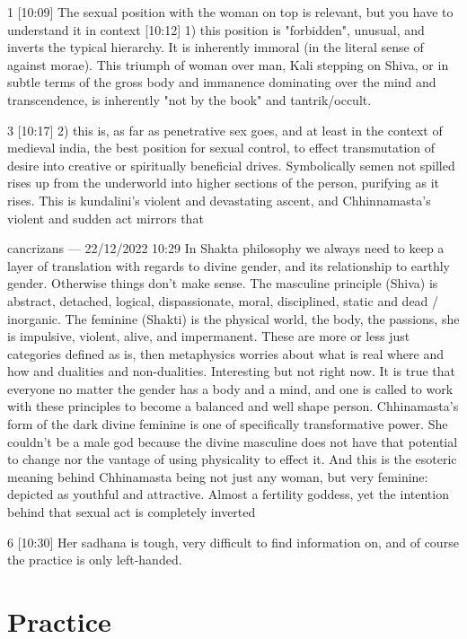 \documentclass[a4paper,14pt]{memoir}
\begin{document}
1
[10:09]
The sexual position with the woman on top is relevant, but you have to understand it in context
[10:12]
1) this position is "forbidden", unusual, and inverts the typical hierarchy. It is inherently immoral (in the literal sense of against morae). This triumph of woman over man, Kali stepping on Shiva, or in subtle terms of the gross body and immanence dominating over the mind and transcendence, is inherently "not by the book" and tantrik/occult.

3
[10:17]
2) this is, as far as penetrative sex goes, and at least in the context of medieval india, the best position for sexual control, to effect transmutation of desire into creative or spiritually beneficial drives. Symbolically semen not spilled rises up from the underworld into higher sections of the person, purifying as it rises. This is kundalini's violent and devastating ascent, and Chhinnamasta's violent and sudden act mirrors that

cancrizans — 22/12/2022 10:29
In Shakta philosophy we always need to keep a layer of translation with regards to divine gender, and its relationship to earthly gender. Otherwise things don't make sense. The masculine principle (Shiva) is abstract, detached, logical, dispassionate, moral, disciplined, static and dead / inorganic. The feminine (Shakti) is the physical world, the body, the passions, she is impulsive, violent, alive, and impermanent. These are more or less just categories defined as is, then metaphysics worries about what is real where and how and dualities and non-dualities. Interesting but not right now. It is true that everyone no matter the gender has a body and a mind, and one is called to work with these principles to become a balanced and well shape person. Chhinamasta's form of the dark divine feminine is one of specifically transformative power. She couldn't be a male god because the divine masculine does not have that potential to change nor the vantage of using physicality to effect it. And this is the esoteric meaning behind Chhinamasta being not just any woman, but very feminine: depicted as youthful and attractive. Almost a fertility goddess, yet the intention behind that sexual act is completely inverted

6
[10:30]
Her sadhana is tough, very difficult to find information on, and of course the practice is only left-handed.

\chapter{Practice}
\end{document}
